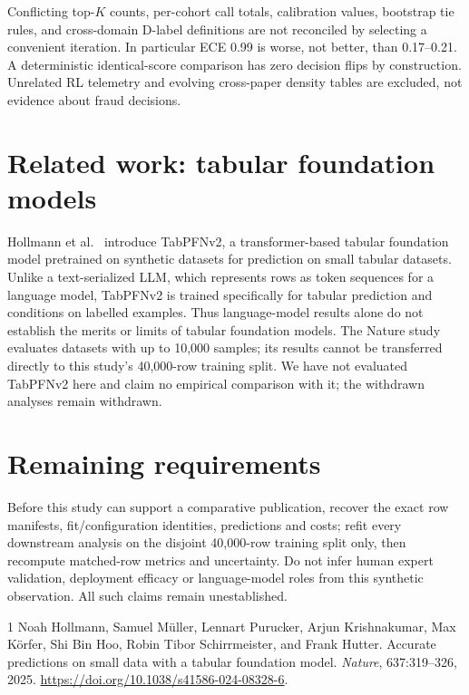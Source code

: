 \documentclass[11pt]{article}
\begin{document}
Conflicting top-$K$ counts, per-cohort call totals, calibration values,
bootstrap tie rules, and cross-domain D-label definitions are not reconciled
by selecting a convenient iteration. In particular ECE 0.99 is worse, not
better, than 0.17--0.21. A deterministic identical-score comparison has
zero decision flips by construction. Unrelated RL telemetry and evolving
cross-paper density tables are excluded, not evidence about fraud decisions.
\section{Related work: tabular foundation models}
Hollmann et al.\ \cite{hollmann2025accurate} introduce TabPFNv2, a
transformer-based tabular foundation model pretrained on synthetic datasets
for prediction on small tabular datasets. Unlike a text-serialized LLM,
which represents rows as token sequences for a language model, TabPFNv2
is trained specifically for tabular prediction and conditions on labelled
examples. Thus language-model results alone do not establish the merits
or limits of tabular foundation models. The Nature study evaluates datasets
with up to 10,000 samples; its results cannot be transferred directly to
this study's 40,000-row training split. We have not evaluated TabPFNv2 here
and claim no empirical comparison with it; the withdrawn analyses remain
withdrawn.
\section{Remaining requirements}
Before this study can support a comparative publication, recover the exact
row manifests, fit/configuration identities, predictions and costs; refit
every downstream analysis on the disjoint 40,000-row training split only, then
recompute matched-row metrics and uncertainty.
Do not infer human expert validation, deployment efficacy or language-model
roles from this synthetic observation. All such claims remain unestablished.
\begin{thebibliography}{1}
Noah Hollmann, Samuel Müller, Lennart Purucker, Arjun Krishnakumar,
Max Körfer, Shi Bin Hoo, Robin Tibor Schirrmeister, and Frank Hutter.
Accurate predictions on small data with a tabular foundation model.
\emph{Nature}, 637:319--326, 2025.
\url{https://doi.org/10.1038/s41586-024-08328-6}.
\end{thebibliography}
\end{document}
